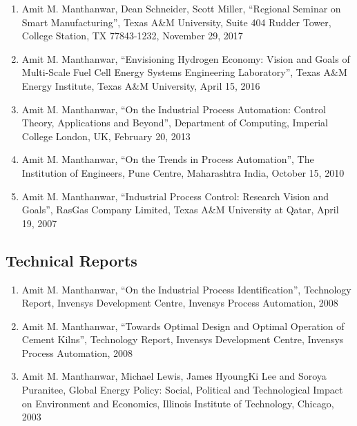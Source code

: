 \documentclass[10pt]{article}
\begin{document}
\begin{enumerate}[nosep]
\item Amit M. Manthanwar, Dean Schneider, Scott Miller, ``Regional Seminar on Smart Manufacturing'', Texas A\&M University, Suite 404 Rudder Tower, College Station, TX 77843-1232, November 29, 2017

\item Amit M. Manthanwar, ``Envisioning Hydrogen Economy: Vision and Goals of Multi-Scale Fuel Cell Energy Systems Engineering Laboratory'', Texas A\&M Energy Institute, Texas A\&M University, April 15, 2016

\item Amit M. Manthanwar, ``On the Industrial Process Automation: Control Theory, Applications and Beyond'', Department of Computing, Imperial College London, UK, February 20, 2013

\item Amit M. Manthanwar, ``On the Trends in Process Automation'', The Institution of Engineers, Pune Centre, Maharashtra India, October 15, 2010

\item Amit M. Manthanwar, ``Industrial Process Control: Research Vision and Goals'', RasGas Company Limited, Texas A\&M University at Qatar, April 19, 2007
\end{enumerate}

\subsection{Technical Reports}
\begin{enumerate}[nosep]
\item Amit M. Manthanwar, ``On the Industrial Process Identification'', Technology Report, Invensys Development Centre, Invensys Process Automation, 2008

\item Amit M. Manthanwar, ``Towards Optimal Design and Optimal Operation of Cement Kilns'',  Technology Report, Invensys Development Centre, Invensys Process Automation, 2008

\item Amit M. Manthanwar, Michael Lewis, James HyoungKi Lee and Soroya Puranitee, Global Energy Policy: Social, Political and Technological Impact on Environment and Economics, Illinois Institute of Technology, Chicago, 2003
\end{enumerate}
\end{document}
